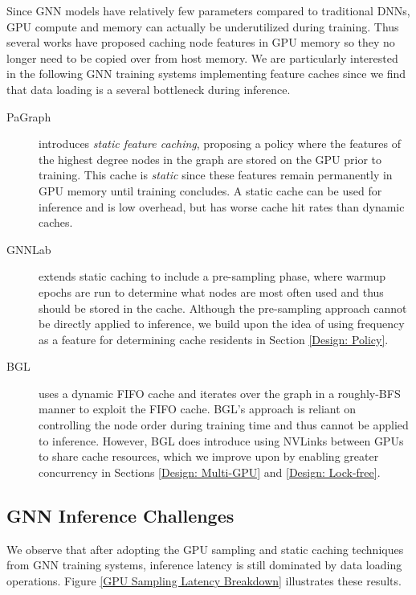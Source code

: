 Since GNN models have relatively few parameters compared to traditional DNNs, GPU compute and memory can actually be underutilized during training. Thus several works have proposed caching node features in GPU memory so they no longer need to be copied over from host memory. We are particularly interested in the following GNN training systems implementing feature caches since we find that data loading is a several bottleneck during inference.

\begin{description}
    \item[PaGraph \cite{PaGraph_2020}] introduces \textit{static feature caching}, proposing a policy where the features of the highest degree nodes in the graph are stored on the GPU prior to training. This cache is \textit{static} since these features remain permanently in GPU memory until training concludes. A static cache can be used for inference and is low overhead, but has worse cache hit rates than dynamic caches.
    \item[GNNLab \cite{GNNLab_2022}] extends static caching to include a pre-sampling phase, where warmup epochs are run to determine what nodes are most often used and thus should be stored in the cache. Although the pre-sampling approach cannot be directly applied to inference, we build upon the idea of using frequency as a feature for determining cache residents in Section \ref{Design: Policy}.
    \item[BGL \cite{BGL_2023}] uses a dynamic FIFO cache and iterates over the graph in a roughly-BFS manner to exploit the FIFO cache. BGL's approach is reliant on controlling the node order during training time and thus cannot be applied to inference. However, BGL does introduce using NVLinks between GPUs to share cache resources, which we improve upon by enabling greater concurrency in Sections \ref{Design: Multi-GPU} and \ref{Design: Lock-free}.
\end{description}

\subsection{GNN Inference Challenges}
We observe that after adopting the GPU sampling and static caching techniques from GNN training systems, inference latency is still dominated by data loading operations. Figure \ref{GPU Sampling Latency Breakdown} illustrates these results. 

